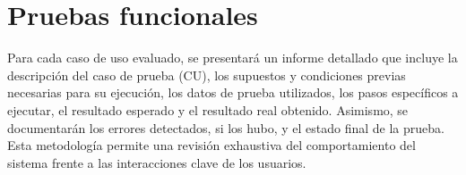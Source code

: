 \section{Pruebas funcionales}

Para cada caso de uso evaluado, se presentará un informe detallado que incluye la descripción del caso de prueba (CU), los supuestos y condiciones previas necesarias para su ejecución, los datos de prueba utilizados, los pasos específicos a ejecutar, el resultado esperado y el resultado real obtenido. Asimismo, se documentarán los errores detectados, si los hubo, y el estado final de la prueba. Esta metodología permite una revisión exhaustiva del comportamiento del sistema frente a las interacciones clave de los usuarios. 



%

















